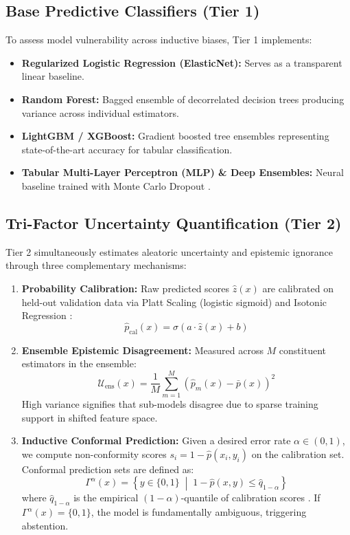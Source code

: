 \documentclass[10pt,a4paper,twocolumn]{article}
\begin{document}
\subsection{Base Predictive Classifiers (Tier 1)}
To assess model vulnerability across inductive biases, Tier 1 implements:
\begin{itemize}
  \item \textbf{Regularized Logistic Regression (ElasticNet):} Serves as a transparent linear baseline.
  \item \textbf{Random Forest:} Bagged ensemble of decorrelated decision trees producing variance across individual estimators.
  \item \textbf{LightGBM / XGBoost:} Gradient boosted tree ensembles representing state-of-the-art accuracy for tabular classification.
  \item \textbf{Tabular Multi-Layer Perceptron (MLP) \& Deep Ensembles:} Neural baseline trained with Monte Carlo Dropout \cite{gal2016dropout}.
\end{itemize}

\subsection{Tri-Factor Uncertainty Quantification (Tier 2)}
Tier 2 simultaneously estimates aleatoric uncertainty and epistemic ignorance through three complementary mechanisms:
\begin{enumerate}
  \item \textbf{Probability Calibration:} Raw predicted scores $\hat{z}(x)$ are calibrated on held-out validation data via Platt Scaling (logistic sigmoid) and Isotonic Regression \cite{guo2017calibration}:
  \begin{equation}
    \hat{p}_{\text{cal}}(x) = \sigma(a \cdot \hat{z}(x) + b)
  \end{equation}
  \item \textbf{Ensemble Epistemic Disagreement:} Measured across $M$ constituent estimators in the ensemble:
  \begin{equation}
    \mathcal{U}_{\text{ens}}(x) = \frac{1}{M}\sum_{m=1}^M \left(\hat{p}_m(x) - \bar{p}(x)\right)^2
  \end{equation}
  High variance signifies that sub-models disagree due to sparse training support in shifted feature space.
  \item \textbf{Inductive Conformal Prediction:} Given a desired error rate $\alpha \in (0,1)$, we compute non-conformity scores $s_i = 1 - \hat{p}(x_i, y_i)$ on the calibration set. Conformal prediction sets are defined as:
  \begin{equation}
    \Gamma^\alpha(x) = \left\{ y \in \{0, 1\} \;\middle\vert\; 1 - \hat{p}(x, y) \le \hat{q}_{1-\alpha} \right\}
  \end{equation}
  where $\hat{q}_{1-\alpha}$ is the empirical $(1-\alpha)$-quantile of calibration scores \cite{angelopoulos2021gentle}. If $\Gamma^\alpha(x) = \{0, 1\}$, the model is fundamentally ambiguous, triggering abstention.
\end{enumerate}
\end{document}
